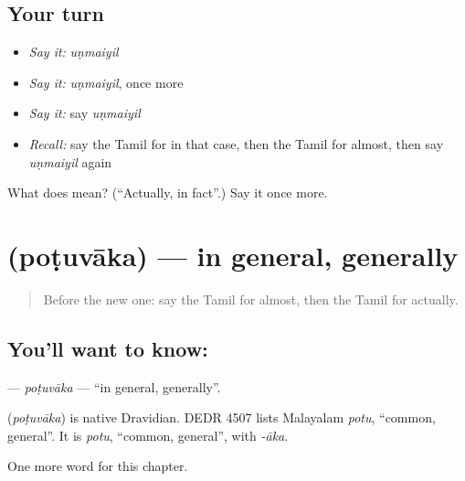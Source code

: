 \subsection*{Your turn}
\begin{itemize}
\raggedright
  \item \emph{Say it:} \emph{uṇmaiyil}
  \item \emph{Say it:} \emph{uṇmaiyil}, once more
  \item \emph{Say it:} say \emph{uṇmaiyil}
  \item \emph{Recall:} say the Tamil for in that case, then the Tamil for almost, then say \emph{uṇmaiyil} again
\end{itemize}

\begin{tcolorbox}[breakable,colback=teal!4,colframe=teal!35!black,title={Before you move on}]
What does  mean? (\textquotedblleft{}Actually, in fact\textquotedblright{}.) Say it once more.
\end{tcolorbox}
\section[\texorpdfstring{\ta{பொதுவாக} (poṭuvāka)}{பொதுவாக (poṭuvāka)}]{ (poṭuvāka) — in general, generally}

\label{lesson:TA-C207-potuvaka}



\begin{quote}
Before the new one: say the Tamil for almost, then the Tamil for actually.
\end{quote}

\subsection*{You'll want to know: }
\textbf{} — \emph{poṭuvāka} — \textquotedblleft{}in general, generally\textquotedblright{}.

\begin{cousinweb}
\textbf{} (\emph{poṭuvāka}) is native Dravidian. DEDR 4507 lists Malayalam \emph{potu}, \textquotedblleft{}common, general\textquotedblright{}. It is \emph{potu}, \textquotedblleft{}common, general\textquotedblright{}, with \emph{-āka}.
\end{cousinweb}

\begin{grammarlens}[title={What you've built}]
One more word for this chapter.
\end{grammarlens}

